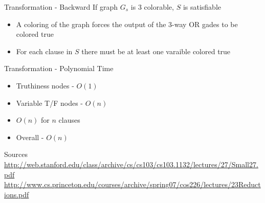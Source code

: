 \documentclass[bigger]{beamer}
\begin{document}
\begin{frame}[label=sec-18]{Transformation - Backward}
If graph \(G_s\) is 3 colorable, \(S\) is satisfiable

\begin{itemize}
\item<1-> A coloring of the graph forces the output of the 3-way OR gades to be colored true
\item<2-> For each clause in \(S\) there must be at least one varaible colored true
\end{itemize}
\end{frame}

\begin{frame}[label=sec-19]{Transformation - Polynomial Time}
\begin{itemize}
\item<1-> Truthiness nodes - \(O(1)\)
\item<2-> Variable T/F nodes - \(O(n)\)
\item<3-> \(O(n)\) for \(n\) clauses
\item<4-> Overall - \(O(n)\)
\end{itemize}
\end{frame}

\begin{frame}[label=sec-20]{Sources}
\url{http://web.stanford.edu/class/archive/cs/cs103/cs103.1132/lectures/27/Small27.pdf}
\url{http://www.cs.princeton.edu/courses/archive/spring07/cos226/lectures/23Reductions.pdf}
\end{frame}
\end{document}
